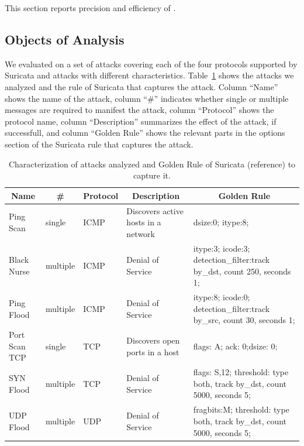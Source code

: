 \documentclass[runningheads]{llncs}
\begin{document}

This section reports precision and efficiency of \tname.


\subsection{Objects of Analysis}

We evaluated \tname{} on a set of attacks covering each of the four
protocols supported by Suricata and attacks with different
characteristics. Table~\ref{table:attacks} shows the attacks we
analyzed and the rule of Suricata that captures the attack. Column
``Name'' shows the name of the attack, column ``\#'' indicates whether
single or multiple messages are required to manifest the attack,
column ``Protocol'' shows the protocol name, column ``Description''
summarizes the effect of the attack, if successfull, and column
``Golden Rule'' shows the relevant parts in the options section of the
Suricata rule that captures the attack.

\begin{table}[t!]
  \caption{\label{table:attacks}Characterization of attacks analyzed
    and Golden Rule of Suricata (reference) to capture it.}  
  \centering
  \begin{tabular}{lllll}
    \toprule
    \multicolumn{1}{c}{Name} & \multicolumn{1}{c}{\#} & \multicolumn{1}{c}{Protocol} & \multicolumn{1}{c}{Description} & \multicolumn{1}{c}{Golden Rule} \\
    \midrule     
    Ping Scan & single & ICMP & Discovers active hosts in a network &  dsize:0; itype:8; \\
    Black Nurse & multiple & ICMP & Denial of Service & itype:3; icode:3; detection\_filter:track by\_dst, count 250, seconds 1;\\
    Ping Flood  & multiple & ICMP & Denial of Service & itype:8; icode:0; detection\_filter:track by\_src, count 30, seconds 1;\\  
    Port Scan TCP & single & TCP & Discovers open ports in a host & flags: A; ack: 0;dsize: 0; \\
    SYN Flood & multiple & TCP & Denial of Service & flags: S,12; threshold: type both, track by\_dst, count 5000, seconds 5;\\
    UDP Flood & multiple & UDP & Denial of Service & fragbits:M; threshold: type both, track by\_dst, count 5000, seconds 5; \\
    \bottomrule
  \end{tabular}
\end{table}
\end{document}

